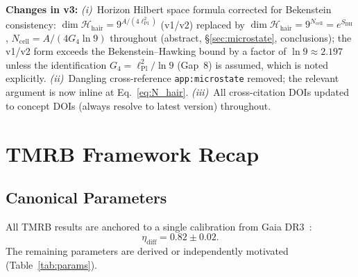 \documentclass[11pt,a4paper]{article}
\begin{document}
\smallskip
\noindent\textbf{Changes in v3:}
\textit{(i)}~Horizon Hilbert space formula corrected for Bekenstein consistency:
$\dim\mathcal{H}_{\mathrm{hair}} = 9^{A/(4\ell_{\mathrm{Pl}}^2)}$ (v1/v2) replaced by
$\dim\mathcal{H}_{\mathrm{hair}} = 9^{N_{\mathrm{cell}}} = e^{S_{\mathrm{BH}}}$,
$N_{\mathrm{cell}} = A/(4G_4\ln 9)$ throughout (abstract, \S\ref{sec:microstate},
conclusions); the v1/v2 form exceeds the Bekenstein--Hawking bound by a factor
of $\ln 9 \approx 2.197$ unless the identification $G_4 = \ell_{\mathrm{Pl}}^2/\ln 9$
(Gap~8) is assumed, which is noted explicitly.
\textit{(ii)}~Dangling cross-reference \texttt{app:microstate} removed; the
relevant argument is now inline at Eq.~\eqref{eq:N_hair}.
\textit{(iii)}~All cross-citation DOIs updated to concept DOIs (always resolve
to latest version) throughout.

\section{TMRB Framework Recap}
\label{sec:recap}

\subsection{Canonical Parameters}

All TMRB results are anchored to a single calibration from Gaia DR3~\cite{GaiaDR3}:
\begin{equation}
  \eta_{\mathrm{diff}} = 0.82 \pm 0.02.
  \label{eq:etadiff}
\end{equation}
The remaining parameters are derived or independently motivated (Table~\ref{tab:params}).
\end{document}
